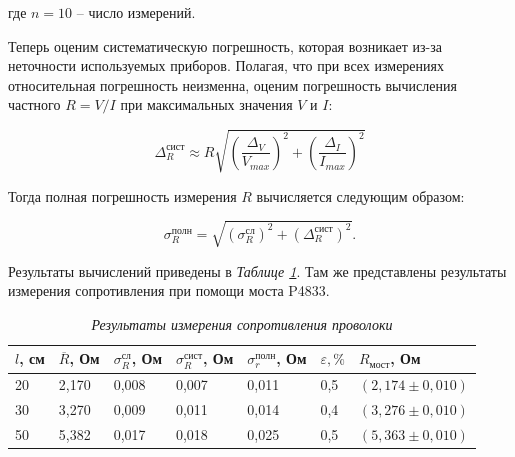 \documentclass[a4paper,12pt]{article} %
\begin{document}
где $ n = 10 $ -- число измерений.

Теперь оценим систематическую погрешность, которая возникает из-за неточности используемых приборов. Полагая, что при всех измерениях относительная погрешность неизменна, оценим погрешность вычисления частного $ R = V / I $ при максимальных значения $ V $ и $ I $:

\begin{equation}
\Delta^\text{сист}_R \approx R\sqrt{\left( \frac{\Delta_V}{V_{max}} \right)^2 + \left( \frac{\Delta_I}{I_{max}} \right)^2  }
\end{equation}

Тогда полная погрешность измерения $ R $ вычисляется следующим образом:

\begin{equation}
\sigma^\text{полн}_R = \sqrt{\left( \sigma^\text{сл}_R \right)^2 + \left( \Delta_R^\text{сист} \right)^2 }.
\end{equation}

\label{chetire}

Результаты вычислений приведены в \textit{Таблице \ref{tab:rezult}}. Там же представлены результаты измерения сопротивления при помощи моста P4833.

\begin{table}[h]
	\begin{tabular}{|l|l|l|l|l|l|l|}
		\hline
		$l$, см & $\overline{R}$, Ом & $ \sigma_R^\text{сл} $, Ом & $ \sigma_R^\text{сист} $, Ом & $ \sigma_r^\text{полн} $, Ом & $ \varepsilon, \% $ & $ R_\text{мост} $, Ом \\ \hline
		20 & 2,170 & 0,008 & 0,007 & 0,011 & 0,5 & $ (2,174 \pm 0,010) $ \\ \hline
		30 & 3,270 & 0,009 & 0,011 & 0,014 & 0,4 & $ (3,276 \pm 0,010) $ \\ \hline
		50 & 5,382 & 0,017 & 0,018 & 0,025 & 0,5 & $ (5,363 \pm 0,010) $ \\ \hline
	\end{tabular}
\caption{\textit{Результаты измерения сопротивления проволоки}}
\label{tab:rezult}
\end{table}
\end{document}
